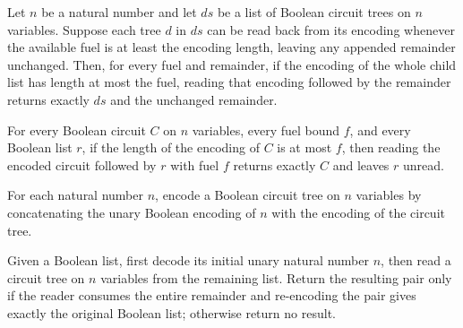 \begin{theorem}
\label{BoolCircuit.readChildren_encodeChildren}
\leanok
{}
Let $n$ be a natural number and let $ds$ be a list of Boolean circuit trees on $n$
variables. Suppose each tree $d$ in $ds$ can be read back from its encoding whenever the
available fuel is at least the encoding length, leaving any appended remainder
unchanged. Then, for every fuel and remainder, if the encoding of the whole child list
has length at most the fuel, reading that encoding followed by the remainder returns
exactly $ds$ and the unchanged remainder.
\end{theorem}

\begin{theorem}
\label{BoolCircuit.readCircuit_encodeCircuit}
\leanok
{}
For every Boolean circuit $C$ on $n$ variables, every fuel bound $f$, and every Boolean
list $r$, if the length of the encoding of $C$ is at most $f$, then reading the encoded
circuit followed by $r$ with fuel $f$ returns exactly $C$ and leaves $r$ unread.
\end{theorem}

\begin{definition}
\label{BoolCircuit.encodeSigma}
\leanok
{}
For each natural number $n$, encode a Boolean circuit tree on $n$ variables by
concatenating the unary Boolean encoding of $n$ with the encoding of the circuit tree.
\end{definition}

\begin{definition}
\label{BoolCircuit.decodeSigma}
\leanok
{}
Given a Boolean list, first decode its initial unary natural number $n$, then read a
circuit tree on $n$ variables from the remaining list. Return the resulting pair only if
the reader consumes the entire remainder and re-encoding the pair gives exactly the
original Boolean list; otherwise return no result.
\end{definition}

